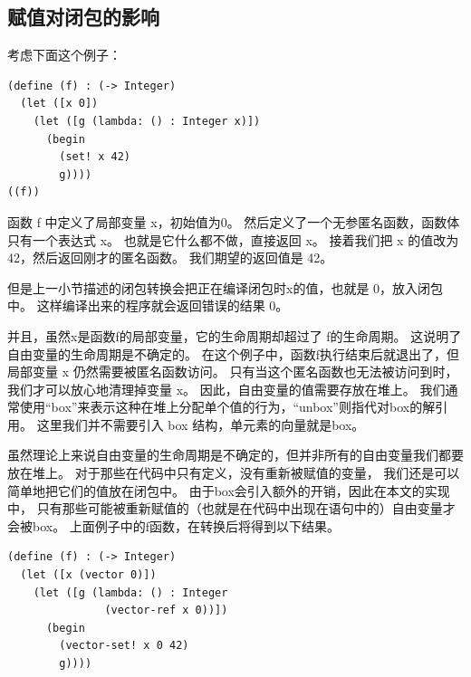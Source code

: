 \subsection{赋值对闭包的影响}

考虑下面这个例子：

\begin{lstlisting}
(define (f) : (-> Integer)
  (let ([x 0])
    (let ([g (lambda: () : Integer x)])
      (begin
        (set! x 42)
        g))))
((f))
\end{lstlisting}

函数 f 中定义了局部变量 x，初始值为0。
然后定义了一个无参匿名函数，函数体只有一个表达式 x。
也就是它什么都不做，直接返回 x。
接着我们把 x 的值改为 42，然后返回刚才的匿名函数。
我们期望的返回值是 42。

但是上一小节描述的闭包转换会把正在编译闭包时x的值，也就是 0，放入闭包中。
这样编译出来的程序就会返回错误的结果 0。

并且，虽然x是函数f的局部变量，它的生命周期却超过了 f的生命周期。
这说明了自由变量的生命周期是不确定的。
在这个例子中，函数f执行结束后就退出了，但局部变量 x 仍然需要被匿名函数访问。
只有当这个匿名函数也无法被访问到时，我们才可以放心地清理掉变量 x。
因此，自由变量的值需要存放在堆上。
我们通常使用“box”来表示这种在堆上分配单个值的行为，“unbox”则指代对box的解引用。
这里我们并不需要引入 box 结构，单元素的向量就是box。

虽然理论上来说自由变量的生命周期是不确定的，但并非所有的自由变量我们都要放在堆上。
对于那些在代码中只有定义，没有重新被赋值的变量，
我们还是可以简单地把它们的值放在闭包中。
由于box会引入额外的开销，因此在本文的实现中，
只有那些可能被重新赋值的（也就是在代码中出现在语句中的）自由变量才会被box。
上面例子中的f函数，在转换后将得到以下结果。

\begin{lstlisting}
(define (f) : (-> Integer)
  (let ([x (vector 0)])
    (let ([g (lambda: () : Integer
               (vector-ref x 0))])
      (begin
        (vector-set! x 0 42)
        g))))
\end{lstlisting}

